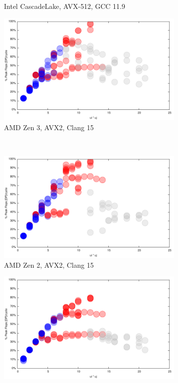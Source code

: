 \documentclass{article}
\begin{document}
\begin{figure}[h!]
\begin{subfigure}[h!]{0.45\textwidth}
  \caption{Intel CascadeLake, AVX-512, GCC 11.9}
  \end{subfigure}
  \begin{subfigure}{0.45\textwidth}  
\includegraphics[width=\textwidth]{../benches/gemm/zen3-64x256x64/greedyp.pdf}
  \caption{AMD Zen 3, AVX2, Clang 15}
  \end{subfigure}\\
  \begin{subfigure}{0.45\textwidth}  
\includegraphics[width=\textwidth]{../benches/gemm/zen3-64x256x64/greedy-zen2p.pdf}
  \caption{AMD Zen 2, AVX2, Clang 15}
  \end{subfigure}
  \begin{subfigure}{0.45\textwidth}  
\includegraphics[width=\textwidth]{../benches/gemm/haswell-64x256x64/greedyp.pdf}

\end{subfigure}
\end{figure}
\end{document}
